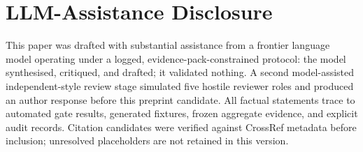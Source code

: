 \documentclass[conference]{IEEEtran}
\begin{document}
\section{LLM-Assistance Disclosure}
\label{sec:llm}

This paper was drafted with substantial assistance from a frontier language model
operating under a logged, evidence-pack-constrained protocol: the model
synthesised, critiqued, and drafted; it validated nothing. A second
model-assisted independent-style review stage simulated five hostile reviewer
roles and produced an author response before this preprint candidate. All factual
statements trace to automated gate results, generated fixtures, frozen aggregate
evidence, and explicit audit records. Citation candidates were verified against
CrossRef metadata before inclusion; unresolved placeholders are not retained in
this version.



\end{document}
